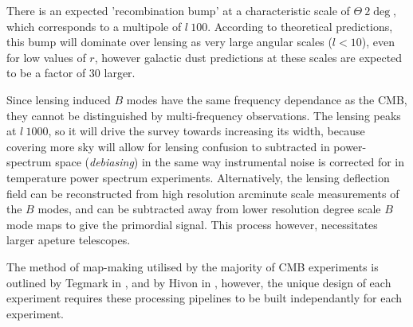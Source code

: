 \par There is an expected 'recombination bump' at a characteristic scale of $\Theta ~ 2\deg$, which corresponds to a multipole of $l ~ 100$. According to theoretical predictions, this bump will dominate over lensing as very large angular scales ($l<10$), even for low values of $r$, however galactic dust predictions at these scales are expected to be a factor of 30 larger.

\par Since lensing induced $B$ modes have the same frequency dependance as the CMB, they cannot be distinguished by multi-frequency observations. The lensing peaks at $l ~1000$, so it will drive the survey towards increasing its width, because covering more sky will allow for lensing confusion to subtracted in power-spectrum space (\textit{debiasing}) in the same way instrumental noise is corrected for in temperature power spectrum experiments. Alternatively, the lensing deflection field can be reconstructed from high resolution arcminute scale measurements of the $B$ modes, and can be subtracted away from lower resolution degree scale $B$ mode maps to give the primordial signal. This process however, necessitates larger apeture telescopes.

\par The method of map-making utilised by the majority of CMB experiments is outlined by Tegmark in \cite{astro-ph/9705188}, and by Hivon in \cite{astro-ph/0105302}, however, the unique design of each experiment requires these processing pipelines to be built independantly for each experiment.
